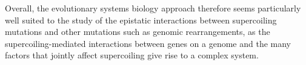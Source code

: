 Overall, the evolutionary systems biology approach therefore seems particularly well suited to the study of the epistatic interactions between supercoiling mutations and other mutations such as genomic rearrangements, as the supercoiling-mediated interactions between genes on a genome and the many factors that jointly affect supercoiling give rise to a complex system.
